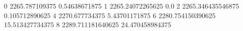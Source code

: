 0 2265.787109375 0.54638671875
1 2265.24072265625 0.0
2 2265.346435546875 0.105712890625
4 2270.677734375 5.43701171875
6 2280.754150390625 15.513427734375
8 2289.711181640625 24.470458984375
